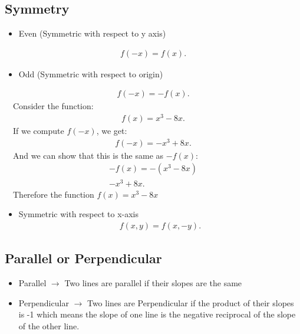 \documentclass{report}
\begin{document}
    \bigbreak \noindent \bigbreak \noindent
    \subsection{Symmetry}
      \begin{itemize}
        \item Even (Symmetric with respect to y axis)
      \end{itemize}
        \begin{align*}
          f(-x) = f(x)
        .\end{align*}

      \begin{itemize}
        \item Odd (Symmetric with respect to origin)
      \end{itemize}
        \begin{align*}
          f(-x) = -f(x)
        .\end{align*}
        \bigbreak \noindent   
        \quad \ \ Consider the function:
        \begin{align*}
          f(x) = x^{3} - 8x
        .\end{align*}
        \quad \ \ If we compute $f(-x)$, we get:
        \begin{align*}
          f(-x) = -x^{3} + 8x
        .\end{align*}
        \quad \ \ And we can show that this is the same as $-f(x)$:
        \begin{align*}
          -f(x) = -(x^{3} - 8x) \\
          -x^{3} +8x
        .\end{align*}
        \quad \ \ Therefore the function $f(x) = x^{3} - 8x$
        \bigbreak \noindent 
        \bigbreak \noindent 
      \begin{itemize}
        \item Symmetric with respect to x-axis
          \begin{align*}
            f(x,y) = f(x,-y)
          .\end{align*}
      \end{itemize}




      \bigbreak \noindent \bigbreak \noindent
      \subsection{Parallel or Perpendicular}
      \begin{itemize}
        \item Parallel $\rightarrow$ Two lines are parallel if their slopes are the same 
        \item Perpendicular $\rightarrow$ Two lines are Perpendicular if the product of their slopes is -1 which means the slope of one line is the negative reciprocal of the slope of the other line.
      \end{itemize}
\end{document}
